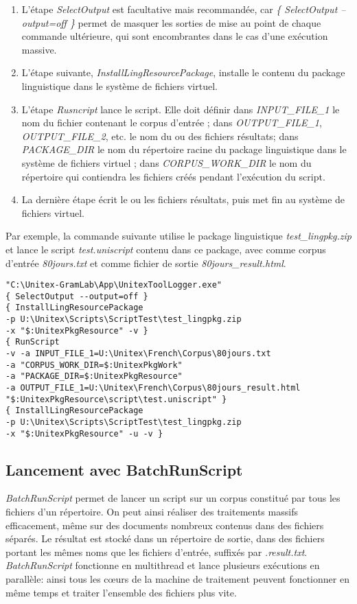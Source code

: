 \begin{enumerate}
\item L'étape \emph{SelectOutput} est facultative mais recommandée, car \emph{\{ SelectOutput --output=off \}} permet de masquer les sorties de mise au point de chaque commande ultérieure, qui sont encombrantes dans le cas d'une exécution massive.
\item L'étape suivante, \emph{InstallLingResourcePackage}, installe le contenu du package linguistique dans le système de fichiers virtuel.
\item L'étape \emph{Rusncript} lance le script. Elle doit définir dans \emph{INPUT\_FILE\_1} le nom du fichier contenant le corpus d'entrée ; dans \emph{OUTPUT\_FILE\_1}, \emph{OUTPUT\_FILE\_2}, etc. le nom du ou des fichiers résultats; dans \emph{PACKAGE\_DIR} le nom du répertoire racine du package linguistique dans le système de fichiers virtuel ; dans \emph{CORPUS\_WORK\_DIR} le nom du répertoire qui contiendra les fichiers créés pendant l'exécution du script.
\item La dernière étape écrit le ou les fichiers résultats, puis met fin au système de fichiers virtuel.
\end{enumerate}

\bigskip
\noindent Par exemple, la commande suivante utilise le package linguistique \emph{test\_lingpkg.zip} et lance le script \emph{test.uniscript} contenu dans ce package, avec comme corpus d'entrée \emph{80jours.txt} et comme fichier de sortie \emph{80jours\_result.html}.

\begin{verbatim}
"C:\Unitex-GramLab\App\UnitexToolLogger.exe" 
{ SelectOutput --output=off } 
{ InstallLingResourcePackage 
-p U:\Unitex\Scripts\ScriptTest\test_lingpkg.zip 
-x "$:UnitexPkgResource" -v } 
{ RunScript 
-v -a INPUT_FILE_1=U:\Unitex\French\Corpus\80jours.txt 
-a "CORPUS_WORK_DIR=$:UnitexPkgWork" 
-a "PACKAGE_DIR=$:UnitexPkgResource" 
-a OUTPUT_FILE_1=U:\Unitex\French\Corpus\80jours_result.html 
"$:UnitexPkgResource\script\test.uniscript" } 
{ InstallLingResourcePackage 
-p U:\Unitex\Scripts\ScriptTest\test_lingpkg.zip 
-x "$:UnitexPkgResource" -u -v }
\end{verbatim}

\subsection{Lancement avec BatchRunScript}

\emph{BatchRunScript} permet de lancer un script sur un corpus constitué par tous les fichiers d'un répertoire. On peut ainsi réaliser des traitements massifs efficacement, même sur des documents nombreux contenus dans des fichiers séparés. Le résultat est stocké dans un répertoire de sortie, dans des fichiers portant les mêmes noms que les fichiers d'entrée, suffixés par \emph{.result.txt}. \emph{BatchRunScript} fonctionne en multithread et lance plusieurs exécutions en parallèle: ainsi tous les cœurs de la machine de traitement peuvent fonctionner en même temps et traiter l’ensemble des fichiers plus vite.

